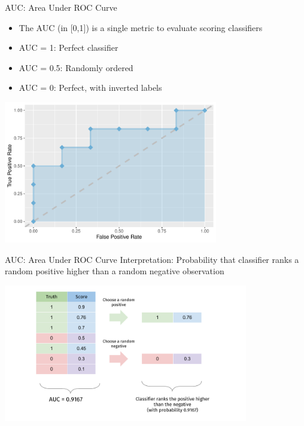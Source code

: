 \documentclass[11pt,compress,t,notes=noshow, xcolor=table]{beamer}
\newenvironment{knitrout}{}{} %
\begin{document}
\begin{vbframe}{AUC: Area Under ROC Curve}

\begin{itemize}
  \item The AUC (in [0,1]) is a single metric to evaluate scoring classifiers
  \item AUC = 1: Perfect classifier
  \item AUC = 0.5: Randomly ordered
  \item AUC = 0: Perfect, with inverted labels
\end{itemize}
\begin{knitrout}\scriptsize
{}\color{fgcolor}

{\centering \includegraphics[width=0.7\textwidth]{figure/eval_mclass_roc_sp_12_1} 

}



\end{knitrout}
\end{vbframe}


\begin{vbframe}{AUC: Area Under ROC Curve}
Interpretation: Probability that classifier ranks a random positive higher than a random negative observation

\begin{center}
\includegraphics[width=0.8\textwidth,page=1]{figure_man/auc_interpretation.pdf}
\end{center}

\end{vbframe}
\end{document}
